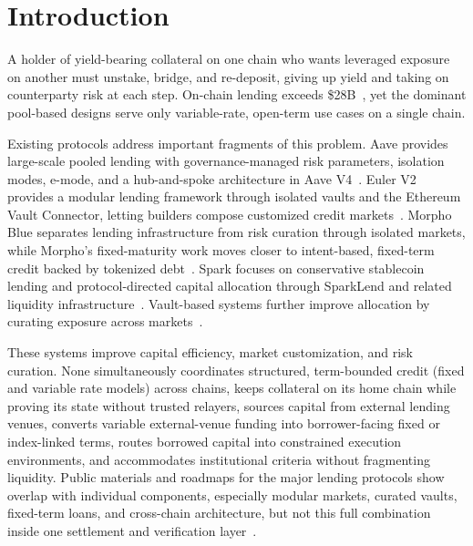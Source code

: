 \section{Introduction}
\label{sec:introduction}

A holder of yield-bearing collateral on one chain who wants leveraged exposure on another must unstake, bridge, and re-deposit, giving up yield and taking on counterparty risk at each step. On-chain lending exceeds \$28B~\cite{defillama}, yet the dominant pool-based designs serve only variable-rate, open-term use cases on a single chain.

Existing protocols address important fragments of this problem. Aave provides large-scale pooled lending with governance-managed risk parameters, isolation modes, e-mode, and a hub-and-spoke architecture in Aave V4~\cite{aave2026}. Euler V2 provides a modular lending framework through isolated vaults and the Ethereum Vault Connector, letting builders compose customized credit markets~\cite{eulerv2}. Morpho Blue separates lending infrastructure from risk curation through isolated markets, while Morpho's fixed-maturity work moves closer to intent-based, fixed-term credit backed by tokenized debt~\cite{morphoblue2023,midnight2025}. Spark focuses on conservative stablecoin lending and protocol-directed capital allocation through SparkLend and related liquidity infrastructure~\cite{spark2023}. Vault-based systems further improve allocation by curating exposure across markets~\cite{zbandut2025}.

These systems improve capital efficiency, market customization, and risk curation. None simultaneously coordinates structured, term-bounded credit (fixed and variable rate models) across chains, keeps collateral on its home chain while proving its state without trusted relayers, sources capital from external lending venues, converts variable external-venue funding into borrower-facing fixed or index-linked terms, routes borrowed capital into constrained execution environments, and accommodates institutional criteria without fragmenting liquidity. Public materials and roadmaps for the major lending protocols show overlap with individual components, especially modular markets, curated vaults, fixed-term loans, and cross-chain architecture, but not this full combination inside one settlement and verification layer~\cite{aave2026,eulerv2,morphoblue2023,midnight2025,spark2023}.

